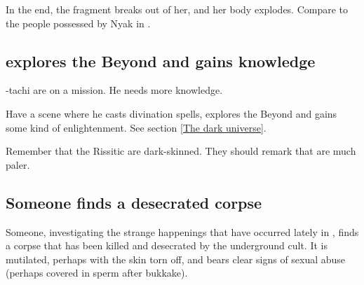 \begin{garbage}
In the end, the fragment breaks out of her, and her body explodes. 
Compare to the people possessed by Nyak in . 










\subsection{\Dzasselid{} explores the Beyond and gains knowledge}
\Dzasselid-tachi are on a mission. He needs more knowledge. 

Have a scene where he casts divination spells, explores the Beyond and gains some kind of enlightenment. See section \ref{The dark universe}.


Remember that the Rissitic \humans{} are dark-skinned. 
They should remark that \Velcadian{} \humans{} are much paler. 









\subsection{Someone finds a desecrated corpse}
Someone, investigating the strange happenings that have occurred lately in \Redce, finds a corpse that has been killed and desecrated by the underground cult. It is mutilated, perhaps with the skin torn off, and bears clear signs of sexual abuse (perhaps covered in sperm after bukkake). 


\end{garbage}
